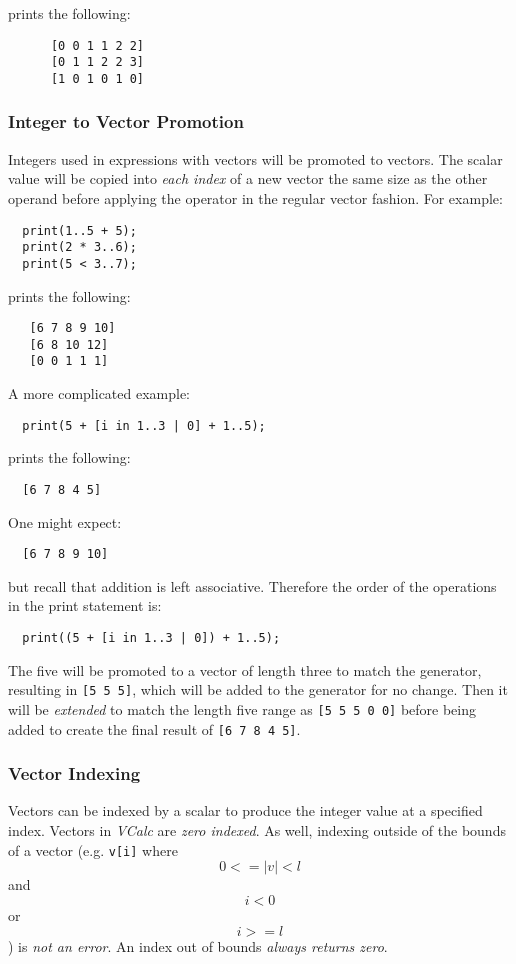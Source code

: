 \documentclass{article}
\newcommand{\code}[1]{\texttt{\textmd{#1}}}
\begin{document}
\begin{enumerate}
    prints the following:
    \begin{lstlisting}
      [0 0 1 1 2 2]
      [0 1 1 2 2 3]
      [1 0 1 0 1 0]
    \end{lstlisting}
\end{enumerate}

\subsubsection{Integer to Vector Promotion}
Integers used in expressions with vectors will be promoted to vectors. The scalar value will be
copied into \textit{each index} of a new vector the same size as the other operand before applying
the operator in the regular vector fashion. For example:
\begin{lstlisting}
  print(1..5 + 5);
  print(2 * 3..6);
  print(5 < 3..7);
\end{lstlisting}

 prints the following:
 \begin{lstlisting}
   [6 7 8 9 10]
   [6 8 10 12]
   [0 0 1 1 1]
 \end{lstlisting}

A more complicated example:
\begin{lstlisting}
  print(5 + [i in 1..3 | 0] + 1..5);
\end{lstlisting}

prints the following:
\begin{lstlisting}
  [6 7 8 4 5]
\end{lstlisting}

One might expect:
\begin{lstlisting}
  [6 7 8 9 10]
\end{lstlisting}

but recall that addition is left associative. Therefore the order of the operations in the print
statement is:
\begin{lstlisting}
  print((5 + [i in 1..3 | 0]) + 1..5);
\end{lstlisting}

The five will be promoted to a vector of length three to match the generator, resulting in
\code{[5 5 5]}, which will be added to the generator for no change. Then it will be
\textit{extended} to match the length five range as \code{[5 5 5 0 0]} before being added to create
the final result of \code{[6 7 8 4 5]}.

\subsubsection{Vector Indexing}
Vectors can be indexed by a scalar to produce the integer value at a specified index. Vectors in
\textit{VCalc} are \textit{zero indexed}. As well, indexing outside of the bounds of a vector (e.g.
\code{v[i]} where $$ 0 <= |v| < l$$ and $$ i < 0 $$ or $$ i >= l$$) is \textit{not an error}. An
index out of bounds \textit{always returns zero}.
\end{document}

